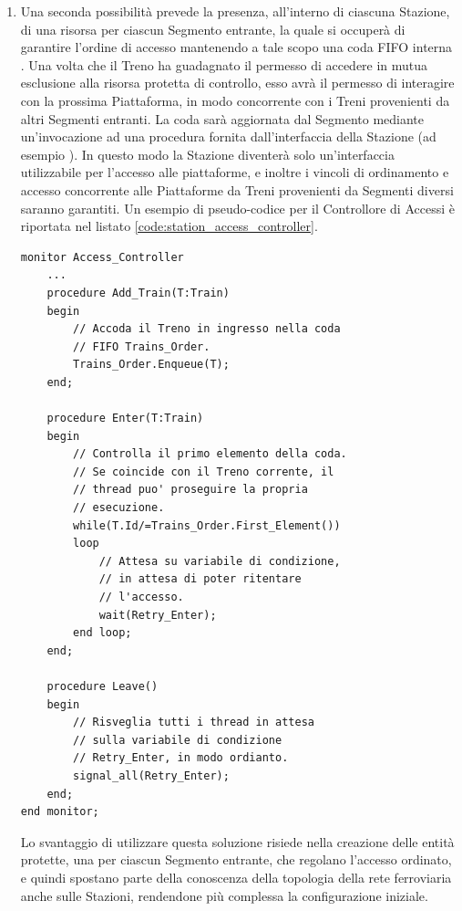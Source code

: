 \begin{description}
\begin{enumerate}
			\item Una seconda possibilità prevede la presenza, all'interno di ciascuna Stazione, di una risorsa   per ciascun Segmento entrante, la quale si occuperà di garantire l'ordine di accesso mantenendo a tale scopo una coda FIFO interna . Una volta che il Treno ha guadagnato il permesso di accedere in mutua esclusione alla risorsa protetta di controllo, esso avrà il permesso di interagire con la prossima Piattaforma, in modo concorrente con i Treni provenienti da altri Segmenti entranti. La coda  sarà aggiornata dal Segmento mediante un'invocazione ad una procedura fornita dall'interfaccia della Stazione (ad esempio ).
			In questo modo la Stazione diventerà solo un'interfaccia utilizzabile per l'accesso alle piattaforme, e inoltre i vincoli di ordinamento e accesso concorrente alle Piattaforme da Treni provenienti da Segmenti diversi saranno garantiti.
			Un esempio di pseudo-codice per il Controllore di Accessi è riportata nel listato \ref{code:station_access_controller}.
			
\begin{lstlisting}[label=code:station_access_controller,caption=\small{Controllore di Accessi che garantisce accesso ordinato.}]	
monitor Access_Controller
	...
	procedure Add_Train(T:Train)
	begin
		// Accoda il Treno in ingresso nella coda
		// FIFO Trains_Order.
		Trains_Order.Enqueue(T);
	end;

	procedure Enter(T:Train) 
	begin
		// Controlla il primo elemento della coda. 
		// Se coincide con il Treno corrente, il 
		// thread puo' proseguire la propria
		// esecuzione.
		while(T.Id/=Trains_Order.First_Element()) 
		loop
			// Attesa su variabile di condizione, 
			// in attesa di poter ritentare 
			// l'accesso.
			wait(Retry_Enter);
		end loop;
	end;

	procedure Leave()
	begin
		// Risveglia tutti i thread in attesa
		// sulla variabile di condizione
		// Retry_Enter, in modo ordianto. 
		signal_all(Retry_Enter);
	end;
end monitor;
\end{lstlisting}
			
			Lo svantaggio di utilizzare questa soluzione risiede nella creazione delle entità protette, una per ciascun Segmento entrante, che regolano l'accesso ordinato, e quindi spostano parte della conoscenza della topologia della rete ferroviaria anche sulle Stazioni, rendendone più complessa la configurazione iniziale.
			

\end{enumerate}
\end{description}
